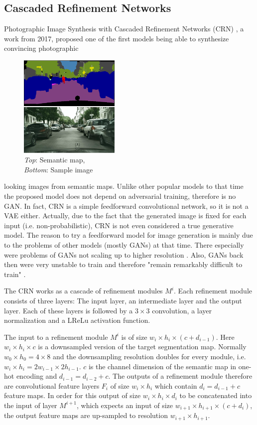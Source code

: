 \subsection{Cascaded Refinement Networks} \label{sec:3.2.1}
Photographic Image Synthesis with Cascaded Refinement Networks (CRN) \cite{crn}, a work from 2017, proposed one of the first models being able to synthesize convincing photographic
%
\begin{figure}
    \begin{center}
        \includegraphics[width=0.43\textwidth]{Chapters/figures/crn_example.PNG}
    \end{center}
    \caption[]{\textit{Top}: Semantic map, \\\textit{Bottom}: Sample image}
\end{figure}
%
looking images from semantic maps. Unlike other popular models to that time the proposed model does not depend on adversarial training, therefore is no GAN. In fact, CRN is a simple feedforward convolutional network, so it is not a VAE either. Actually, due to the fact that the generated image is fixed for each input (i.e. non-probabilistic), CRN is not even considered a true generative model. The reason to try a feedforward model for image generation is mainly due to the problems of other models (mostly GANs) at that time. There especially were problems of GANs not scaling up to higher resolution \cite{crn}. Also, GANs back then were very unstable to train and therefore "remain remarkably difficult to train"
\cite{crn}.

The CRN works as a cascade of refinement modules $M^i$. Each refinement module consists of three layers: The input layer, an intermediate layer and the output layer. Each of these layers is followed by a $3\times3$ convolution, a layer normalization and a LReLu activation function. 

The input to a refinement module $M^i$ is of size $w_i\times h_i\times(c + d_{i-1})$. Here $w_i\times h_i\times c$ is a downsampled version of the target segmentation map. Normally $w_0\times h_0=4\times 8$ and the downsampling resolution doubles for every module, i.e. $w_i\times h_i=2w_{i-1}\times2h_{i-1}$. $c$ is the channel dimension of the semantic map in one-hot encoding and $d_{i-1}=d_{i-2}+c$. The outputs of a refinement module therefore are convolutional feature layers $F_i$ of size $w_i\times h_i$ which contain $d_i=d_{i-1}+c$ feature maps. In order for this output of size $w_i\times h_i\times d_i$ to be concatenated into the input of layer $M^{i+1}$, which expects an input of size $w_{i+1}\times h_{i+1}\times (c + d_i)$, the output feature maps are up-sampled to resolution $w_{i+1}\times h_{i+1}$.

